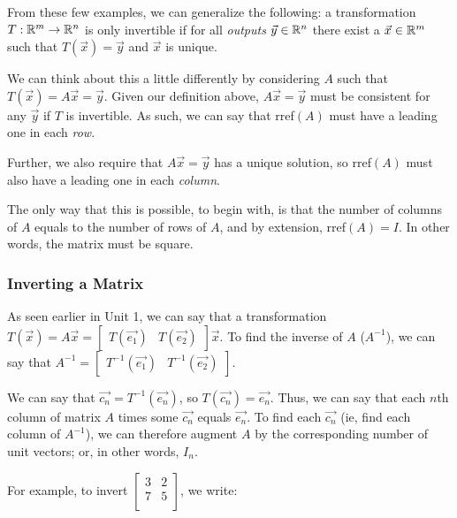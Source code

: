 \documentclass[12pt]{article}
\begin{document}
From these few examples, we can generalize the following: a transformation $T: \mathbb{R}^m \to \mathbb{R}^n$ is only invertible if for all \textit{outputs} $\vec{y} \in \mathbb{R}^n$ there exist a $\vec{x} \in \mathbb{R}^m$ such that $T(\vec{x}) = \vec{y}$ and $\vec{x}$ is unique.

We can think about this a little differently by considering $A$ such that $T(\vec{x})=A\vec{x} = \vec{y}$. Given our definition above, $A\vec{x}=\vec{y}$ must be consistent for any $\vec{y}$ if $T$ is invertible. As such, we can say that rref$(A)$ must have a leading one in each \textit{row}.

Further, we also require that $A\vec{x}=\vec{y}$ has a unique solution, so rref$(A)$ must also have a leading one in each \textit{column}. 

The only way that this is possible, to begin with, is that the number of columns of $A$ equals to the number of rows of $A$, and by extension, rref$(A) = I$. In other words, the matrix must be square.

\subsubsection{Inverting a Matrix}

As seen earlier in Unit 1, we can say that a transformation $T(\vec{x}) = A\vec{x} = \begin{bmatrix}
T(\vec{e_1}) & T(\vec{e_2})
\end{bmatrix}\vec{x}$. To find the inverse of $A$ ($A^{-1}$), we can say that $A^{-1} = \begin{bmatrix}T^{-1}(\vec{e_1}) & T^{-1}(\vec{e_2})\end{bmatrix}$.

We can say that $\vec{c_n} = T^{-1}(\vec{e_n})$, so $T(\vec{c_n}) = \vec{e_n}$. Thus, we can say that each $n$th column of matrix $A$ times some $\vec{c_n}$ equals $\vec{e_n}$. To find each $\vec{c_n}$ (ie, find each column of $A^{-1}$), we can therefore augment $A$ by the corresponding number of unit vectors; or, in other words, $I_n$.

For example, to invert $\begin{bmatrix} 3 & 2\\
7 & 5\\
\end{bmatrix}$, we write:
\end{document}
